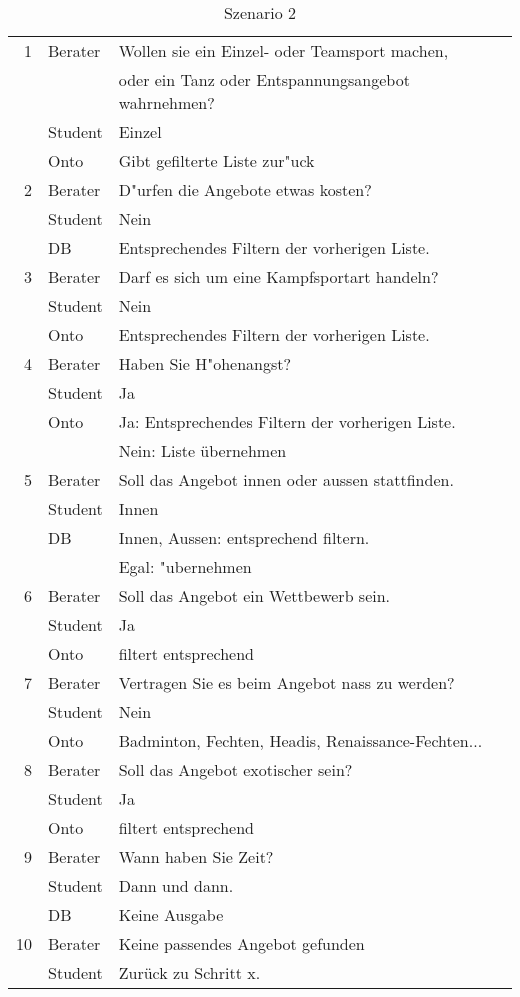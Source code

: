 \begin{table}
	\centering
		\begin{tabular}{|r|l|l|}
\hline
1 &	Berater	& Wollen sie ein Einzel- oder Teamsport machen,\\
&& oder ein Tanz oder Entspannungsangebot wahrnehmen?\\
	& Student	& Einzel\\
\hline
	& Onto &	Gibt gefilterte Liste zur"uck\\
2	& Berater	& D"urfen die Angebote etwas kosten?\\
\hline
	& Student	& Nein\\ 
\hline
	& DB & Entsprechendes Filtern der vorherigen Liste.\\
\hline
3	& Berater	& Darf es sich um eine Kampfsportart handeln?\\
\hline
	& Student	& Nein\\
\hline
	& Onto & Entsprechendes Filtern der vorherigen Liste.\\
\hline
4	& Berater	& Haben Sie H"ohenangst?\\
\hline
	& Student	& Ja\\
\hline
	& Onto	&Ja: Entsprechendes Filtern der vorherigen Liste.\\
\hline
	& & Nein: Liste übernehmen\\
\hline
5	& Berater& Soll das Angebot innen oder aussen stattfinden.\\
\hline
	& Student& Innen\\
\hline
	& DB & Innen, Aussen: entsprechend filtern.\\
\hline
	& &Egal: "ubernehmen\\
\hline
6	&Berater&	Soll das Angebot ein Wettbewerb sein.\\
\hline
	&Student&	Ja\\
\hline
	&Onto	&filtert entsprechend\\
\hline
7	&Berater&Vertragen Sie es beim Angebot nass zu werden?\\
\hline
	&Student&Nein\\
\hline
	&Onto	&Badminton, Fechten, Headis, Renaissance-Fechten...\\
\hline
8	&Berater &Soll das Angebot exotischer sein?\\
\hline
	&Student&Ja\\
\hline
	&Onto&filtert entsprechend\\
\hline
9	&Berater&Wann haben Sie Zeit?\\
\hline
	&Student&	Dann und dann.\\
\hline
	&DB&Keine Ausgabe\\
\hline
10&Berater&Keine passendes Angebot gefunden\\
\hline
	&Student&Zurück zu Schritt x.\\
\hline
	\end{tabular}
	
\caption[Szenario 2]{Szenario 2}

\end{table}